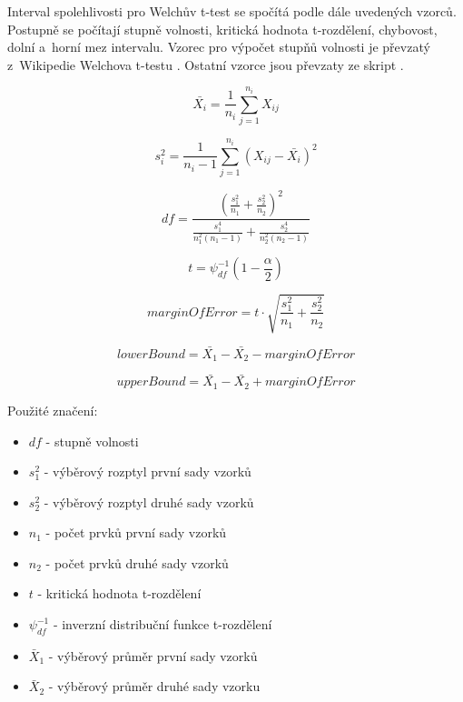 Interval spolehlivosti pro Welchův t-test se spočítá podle dále uvedených vzorců.
Postupně se počítají stupně volnosti, kritická hodnota t-rozdělení, chybovost, dolní a~horní mez intervalu.
Vzorec pro výpočet stupňů volnosti je převzatý z~Wikipedie Welchova t-testu \cite[]{enwiki:1184251732}.
Ostatní vzorce jsou převzaty ze skript \cite[]{samal_nmai059_nodate}.

\begin{equation*}
    \bar{X_i} = \frac{1}{n_i} \sum_{j=1}^{n_i} X_{ij}
\end{equation*}

\begin{equation*}
    s_i^2 = \frac{1}{n_i-1} \sum_{j=1}^{n_i} (X_{ij} - \bar{X_i})^2
\end{equation*}

\begin{equation*} \label{eq:welch_df}
    df = \frac{(\frac{s_1^2}{n_1} + \frac{s_2^2}{n_2})^2}{\frac{s_1^4}{n_1^2(n_1-1)} + \frac{s_2^4}{n_2^2(n_2-1)}}
\end{equation*}

\begin{equation*}
    t = \psi_{df}^{-1}(1-\frac{\alpha}{2})
\end{equation*}

\begin{equation*}
    marginOfError = t \cdot \sqrt{\frac{s_1^2}{n_1} + \frac{s_2^2}{n_2}}
\end{equation*}

\begin{equation*}
    lowerBound = \bar{X_1} - \bar{X_2} - marginOfError
\end{equation*}

\begin{equation*}
    upperBound = \bar{X_1} - \bar{X_2} + marginOfError
\end{equation*}

Použité značení:
\begin{itemize}
    \item $df$ - stupně volnosti
    \item $s_1^2$ - výběrový rozptyl první sady vzorků
    \item $s_2^2$ - výběrový rozptyl druhé sady vzorků
    \item $n_1$ - počet prvků první sady vzorků
    \item $n_2$ - počet prvků druhé sady vzorků
    \item $t$ - kritická hodnota t-rozdělení
    \item $\psi_{df}^{-1}$ - inverzní distribuční funkce t-rozdělení
    \item $\bar{X}_1$ - výběrový průměr první sady vzorků
    \item $\bar{X}_2$ - výběrový průměr druhé sady vzorku
\end{itemize}


